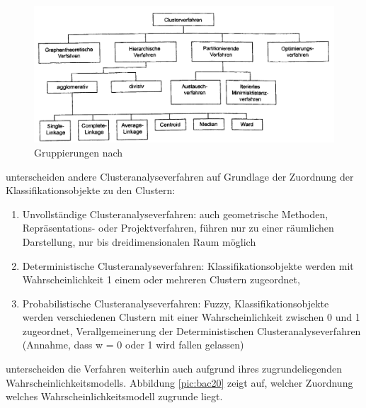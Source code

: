 \begin{figure}[h]
	\begin{center}
		\includegraphics[width=14cm]{pics/backhaus476.png}
	\end{center}
	\caption{Gruppierungen nach \citet[S. 476]{Backhaus.2016}}
	\label{pic:backhaus476}
\end{figure}

\citet[S. 18]{Bacher.2010} unterscheiden andere Clusteranalyseverfahren auf Grundlage der Zuordnung der Klassifikationsobjekte zu den Clustern:

\begin{enumerate}
	\item Unvollständige Clusteranalyseverfahren: auch geometrische Methoden, Repräsentations- oder Projektverfahren, führen nur zu einer räumlichen Darstellung, nur bis dreidimensionalen Raum möglich
	\item Deterministische Clusteranalyseverfahren: Klassifikationsobjekte werden mit Wahrscheinlichkeit 1 einem oder mehreren Clustern zugeordnet, 
	\item Probabilistische Clusteranalyseverfahren: Fuzzy, Klassifikationsobjekte werden verschiedenen Clustern mit einer Wahrscheinlichkeit zwischen 0 und 1 zugeordnet, Verallgemeinerung der Deterministischen Clusteranalyseverfahren (Annahme, dass w = 0 oder 1 wird fallen gelassen)
\end{enumerate}

\citet[S. 21]{Bacher.2010} unterscheiden die Verfahren weiterhin auch aufgrund ihres zugrundeliegenden Wahrscheinlichkeitsmodells. Abbildung \ref{pic:bac20} zeigt auf, welcher Zuordnung welches Wahrscheinlichkeitsmodell zugrunde liegt.

